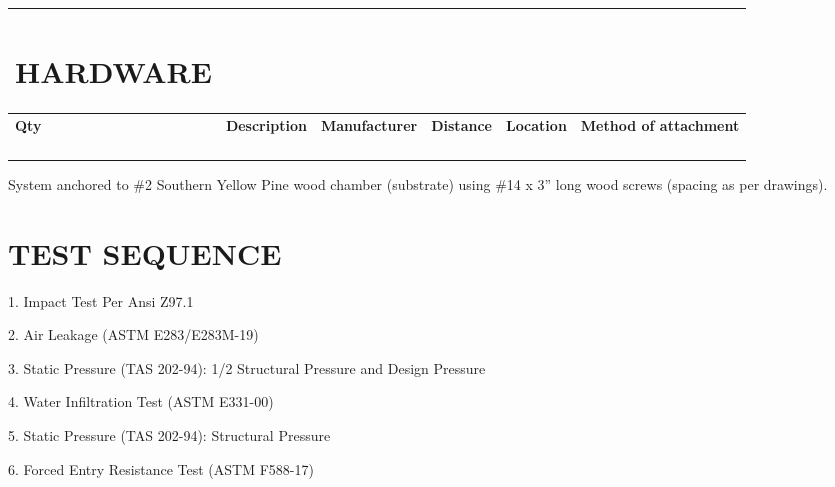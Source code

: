 \begin{longtable}[]{@{}llllll@{}}
\toprule
\begin{minipage}[b]{0.14\columnwidth}\raggedright
\hypertarget{hardware-1}{%
\section{\texorpdfstring{\textbf{HARDWARE}}{HARDWARE}}\label{hardware-1}}\strut
\end{minipage} & \begin{minipage}[b]{0.14\columnwidth}\raggedright
\strut
\end{minipage} & \begin{minipage}[b]{0.14\columnwidth}\raggedright
\strut
\end{minipage} & \begin{minipage}[b]{0.14\columnwidth}\raggedright
\strut
\end{minipage} & \begin{minipage}[b]{0.14\columnwidth}\raggedright
\strut
\end{minipage} & \begin{minipage}[b]{0.14\columnwidth}\raggedright
\strut
\end{minipage}\tabularnewline
\midrule
\endhead
\textbf{Qty} & \textbf{Description} & \textbf{Manufacturer} &
\textbf{Distance} & \textbf{Location} & \textbf{Method of
attachment}\tabularnewline
& & & & &\tabularnewline
& & & & &\tabularnewline
& & & & &\tabularnewline
& & & & &\tabularnewline
\bottomrule
\end{longtable}

System anchored to \#2 Southern Yellow Pine wood chamber (substrate)
using \#14 x 3'' long wood screws (spacing as per drawings).

\hypertarget{test-sequence-1}{%
\section{\texorpdfstring{\textbf{TEST
SEQUENCE}}{TEST SEQUENCE}}\label{test-sequence-1}}

1. Impact Test Per Ansi Z97.1

2. Air Leakage (ASTM E283/E283M-19)

3. Static Pressure (TAS 202-94): 1/2 Structural Pressure and Design
Pressure

4. Water Infiltration Test (ASTM E331-00)

5. Static Pressure (TAS 202-94): Structural Pressure

6. Forced Entry Resistance Test (ASTM F588-17)

